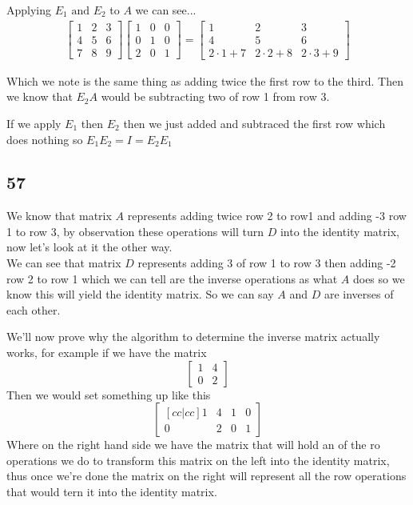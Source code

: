 \documentclass[11pt]{book}
\begin{document}
Applying $E_{1} \text{ and } E_2$ to $A$ we can see...
\begin{gather*}
    \begin{bmatrix}
    	1 & 2 & 3 \\
    	4 & 5 & 6 \\
    	7 & 8 & 9 
    \end{bmatrix}
    \begin{bmatrix}
    	1 & 0 & 0 \\
    	0 & 1 & 0 \\
    	2 & 0 & 1 
    \end{bmatrix}
    = 
    \begin{bmatrix}
    	1 & 2 & 3 \\
    	4 & 5 & 6 \\
    	2 \cdot 1 + 7 & 2 \cdot 2 + 8 & 2 \cdot 3 + 9 
    \end{bmatrix}
\end{gather*}


Which we note is the same thing as adding twice the first row to the third. Then we know that $E_2A$ would be subtracting two of row 1 from row 3.

If we apply $E_1$ then $E_2$ then we just added and subtraced the first row which does nothing so $E_1E_2 = I= E_2E_1$ 
    


\subsection{57}%
\label{sub:57}

We know that matrix $A$ represents adding twice row 2 to row1 and adding -3 row 1 to row 3, by observation these operations will turn $D$ into the identity matrix, now let's look at it the other way.\\
We can see that matrix $D$ represents adding 3 of row 1 to row 3 then adding -2 row 2 to row 1 which we can tell are the inverse operations as what $A$ does so we know this will yield the identity matrix. So we can say $A$ and $D$ are inverses of each other.




We'll now prove why the algorithm to determine the inverse matrix actually works, for example if we have the matrix 
\[
\begin{bmatrix}
    1 & 4 \\
    0 & 2 
\end{bmatrix}
\]
Then we would set something up like this
\[
\begin{bmatrix}[cc|cc]
    1 & 4 & 1 & 0 \\
    0 & 2 & 0 & 1 
\end{bmatrix}
\]
Where on the right hand side we have the matrix that will hold an of the ro operations we do to transform this matrix on the left into the identity matrix, thus once we're done the matrix on the right will represent all the row operations that would tern it into the identity matrix.
\end{document}
